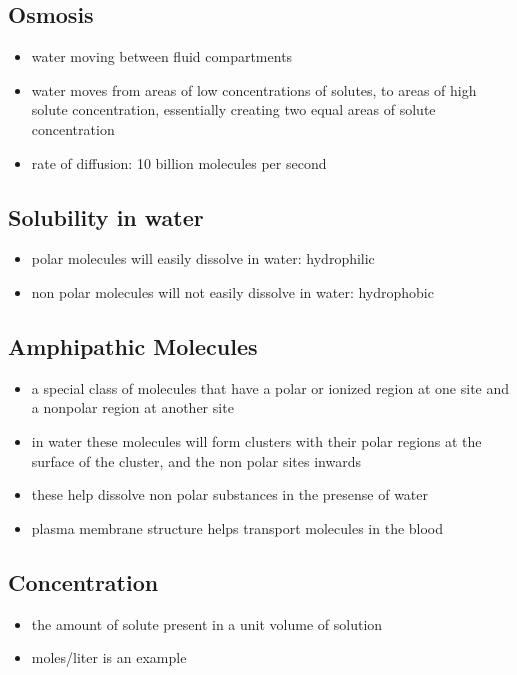 \documentclass[11pt]{article}
\begin{document}
\subsection{Osmosis}
\label{sec:org940f0f5}
\begin{itemize}
\item water moving between fluid compartments
\item water moves from areas of low concentrations of solutes, to areas of high solute concentration, essentially creating two equal areas of solute concentration
\item rate of diffusion: 10 billion molecules per second
\end{itemize}
\subsection{Solubility in water}
\label{sec:org7316e74}
\begin{itemize}
\item polar molecules will easily dissolve in water: hydrophilic
\item non polar molecules will not easily dissolve in water: hydrophobic
\end{itemize}
\subsection{Amphipathic Molecules}
\label{sec:orge33f8e9}
\begin{itemize}
\item a special class of molecules that have a polar or ionized region at one site and a nonpolar region at another site
\item in water these molecules will form clusters with their polar regions at the surface of the cluster, and the non polar sites inwards
\item these help dissolve non polar substances in the presense of water
\item plasma membrane structure helps transport molecules in the blood
\end{itemize}
\subsection{Concentration}
\label{sec:org077ad03}
\begin{itemize}
\item the amount of solute present in a unit volume of solution
\item moles/liter is an example
\end{itemize}
\end{document}

